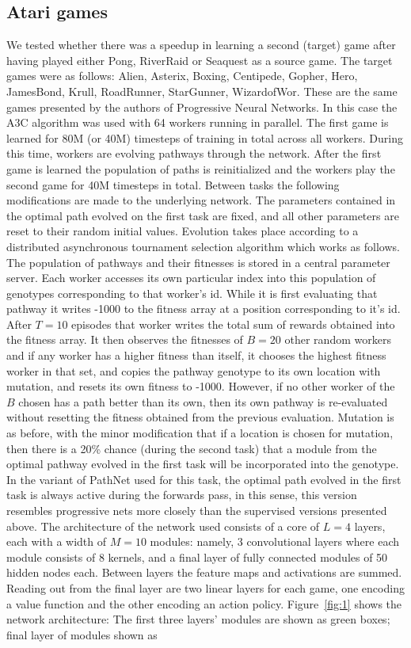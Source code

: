 \documentclass{sig-alternate-05-2015}
\begin{document}
\subsection{Atari games} 
 We tested whether there was a speedup in learning a second (target) game after having played either Pong, RiverRaid or Seaquest as a source game. The target games were as follows: Alien, Asterix, Boxing, Centipede, Gopher, Hero, JamesBond, Krull, RoadRunner, StarGunner, WizardofWor. These are the same games presented by the authors of Progressive Neural Networks. In this case the A3C algorithm was used with 64 workers running in parallel. The first game is learned for 80M (or 40M) timesteps of training in total across all workers. During this time, workers are evolving pathways through the network. After the first game is learned the population of paths is reinitialized and the workers play the second game for 40M timesteps in total. Between tasks the following modifications are made to the underlying network. The parameters contained in the optimal path evolved on the first task are fixed, and all other parameters are reset to their random initial values. Evolution takes place according to a distributed asynchronous tournament selection algorithm which works as follows. The population of pathways and their fitnesses is stored in a central parameter server. Each worker accesses its own particular index into this population of genotypes corresponding to that worker's id. While it is first evaluating that pathway it writes -1000 to the fitness array at a position corresponding to it's id. After \(T = 10\) episodes that worker writes the total sum of rewards obtained into the fitness array. It then observes the fitnesses of \(B = 20\) other random workers and if any worker has a higher fitness than itself, it chooses the highest fitness worker in that set, and copies the pathway genotype to its own location with mutation, and resets its own fitness to -1000. However, if no other worker of the \(B\) chosen has a path better than its own, then its own pathway is re-evaluated without resetting the fitness obtained from the previous evaluation. Mutation is as before, with the minor modification that if a location is chosen for mutation, then there is a 20\% chance (during the second task) that a module from the optimal pathway evolved in the first task will be incorporated into the genotype. In the variant of PathNet used for this task, the optimal path evolved in the first task is always active during the forwards pass, in this sense, this version resembles progressive nets more closely than the supervised versions presented above. The architecture of the network used consists of a core of \(L = 4\) layers, each with a width of \(M = 10\) modules: namely, 3 convolutional layers where each module consists of 8 kernels, and a final layer of fully connected modules of 50 hidden nodes each. Between layers the feature maps and activations are summed. Reading out from the final layer are two linear layers for each game, one encoding a value function and the other encoding an action policy. Figure~\ref{fig:1} shows the network architecture: The first three layers' modules are shown as \textcolor{fig2_green}{green boxes}; final layer of modules shown as 
\end{document}
